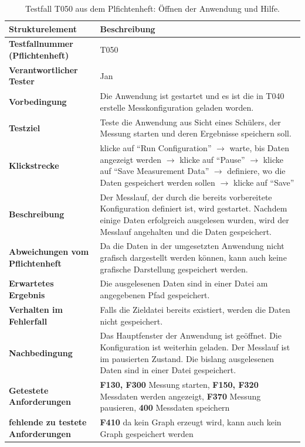 \documentclass[parskip=full]{scrartcl}
\begin{document}
\begin{table}[h]
\begin{tabular}{| p{4cm} | p{10cm} |}
	\hline
	\textbf{Strukturelement} & \textbf{Beschreibung} \\ \hline
	\textbf{Testfallnummer (Pflichtenheft)}
	& 
	T050
	\\ \hline
	\textbf{Verantwortlicher Tester}
	& 
	Jan
	\\ \hline
	\textbf{Vorbedingung}
	& 
	Die Anwendung ist gestartet und es ist die in T040 erstelle Messkonfiguration geladen worden.
	\\ \hline
	\textbf{ Testziel}
	& 
	Teste die Anwendung aus Sicht eines Schülers, der Messung starten und deren Ergebnisse speichern soll.
	\\ \hline
	
	\textbf{Klickstrecke}
	& 
	klicke auf ``Run Configuration'' $\rightarrow$ warte, bis Daten angezeigt werden $\rightarrow$ klicke auf ``Pause'' $\rightarrow$ klicke auf ``Save Measurement Data'' $\rightarrow$ definiere, wo die Daten gespeichert werden sollen $\rightarrow$ klicke auf ``Save''
	\\ \hline
	
	\textbf{ Beschreibung}
	& 
	Der Messlauf, der durch die bereits vorbereitete Konfiguration definiert ist, wird gestartet. Nachdem einige Daten erfolgreich ausgelesen wurden, wird der Messlauf angehalten und die Daten gespeichert.
	\\ \hline
	
	\textbf{Abweichungen vom Pflichtenheft}
	& 
	Da die Daten in der umgesetzten Anwendung nicht grafisch dargestellt werden können, kann auch keine grafische Darstellung gespeichert werden.

	\\ \hline
	
	\textbf{Erwartetes Ergebnis}
	& 
	Die ausgelesenen Daten sind in einer Datei am angegebenen Pfad gespeichert.
	\\ \hline
			
	\textbf{Verhalten im Fehlerfall}
	& 
	Falls die Zieldatei bereits existiert, werden die Daten nicht gespeichert.
	\\ \hline
	
	\textbf{Nachbedingung}
	& 
	Das Hauptfenster der Anwendung ist geöffnet. Die Konfiguration ist weiterhin geladen. Der Messlauf ist im pausierten Zustand. Die bislang ausgelesenen Daten sind in einer Datei gespeichert.
	\\ \hline
	
	
	\textbf{Getestete Anforderungen}
	& 
	\textbf{F130, F300} Messung starten, \textbf{F150, F320} Messdaten werden angezeigt, \textbf{F370} Messung pausieren, \textbf{400} Messdaten speichern
	\\ \hline
	\textbf{fehlende zu testete Anforderungen}
	& 
	\textbf{F410} da kein Graph erzeugt wird, kann auch kein Graph gespeichert werden
	
	\\ \hline
	
	
\end{tabular}
\caption{Testfall T050 aus dem Plfichtenheft: Öffnen der Anwendung und Hilfe.}
\label{testfallT050}
\end{table}
\end{document}
